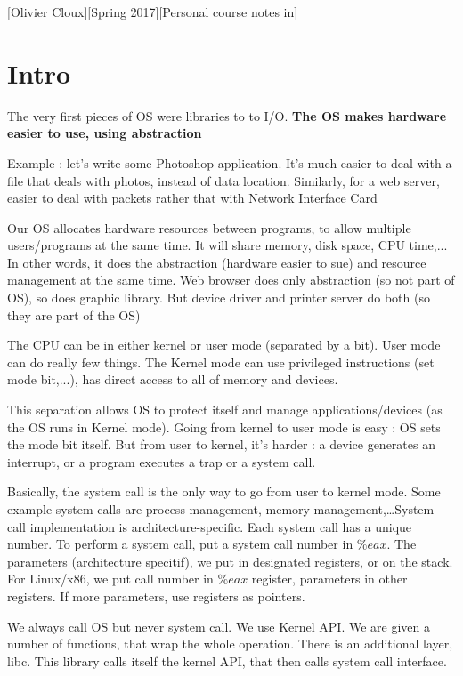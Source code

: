 \documentclass[12pt,a4paper]{article}
\begin{document}
[Olivier Cloux][Spring 2017][Personal course notes in]
\tableofcontents
{}

\section{Intro}
The very first pieces of OS were libraries to to I/O.
\textbf{The OS makes hardware easier to use, using abstraction}

Example : let's write some Photoshop application. It's much easier to deal with a file that deals with photos, instead of data location. Similarly, for a web server, easier to deal with packets rather that with Network Interface Card

Our OS allocates hardware resources between programs, to allow multiple users/programs at the same time. It will share memory, disk space, CPU time,... In other words, it does the abstraction (hardware easier to sue) and resource management \underline{at the same time}. Web browser does only abstraction (so not part of OS), so does graphic library. But device driver and printer server do both (so they are part of the OS)

The CPU can be in either kernel or user mode (separated by a bit). User mode can do really few things. The Kernel mode can use privileged instructions (set mode bit,...), has direct access to all of memory and devices. 

This separation allows OS to protect itself and manage applications/devices (as the OS runs in Kernel mode). Going from kernel to user mode is easy : OS sets the mode bit itself. But from user to kernel, it's harder : a device generates an interrupt, or a program executes a trap or a system call.

Basically, the system call is the only way to go from user to kernel mode. Some example system calls are process management, memory management,\ldots System call implementation is architecture-specific. Each system call has a unique number. To perform a system call, put a system call number in $\%eax$. The parameters (architecture specitif), we put in designated registers, or on the stack. For Linux/x86, we put call number in $\%eax$ register, parameters in other registers. If more parameters, use registers as pointers.

We always call OS but never system call. We use Kernel API. We are given a number of functions, that wrap the whole operation. There is an additional layer, libc. This library calls itself the kernel API, that then calls system call interface.
\end{document}
